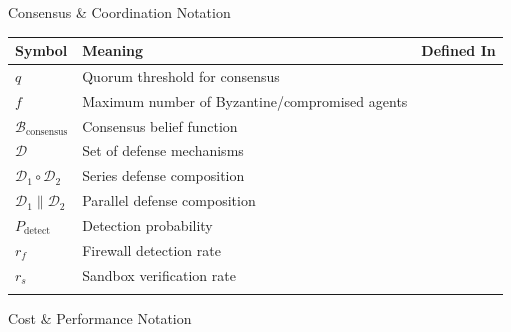\documentclass[
  ignorenonframetext,
]{beamer}
\newcounter{none} %
\providecommand{\cref}[1]{\texttt{\detokenize{#1}}}
\begin{document}
\begin{frame}[allowframebreaks]{Consensus \& Coordination Notation}
{\def\LTcaptype{none} %
\begin{longtable}[]{@{}
  >{\raggedright\arraybackslash}p{}
  >{\raggedright\arraybackslash}p{}
  >{\raggedright\arraybackslash}p{}@{}}
\toprule\noalign{}
\begin{minipage}[b]{\linewidth}\raggedright
Symbol
\end{minipage} & \begin{minipage}[b]{\linewidth}\raggedright
Meaning
\end{minipage} & \begin{minipage}[b]{\linewidth}\raggedright
Defined In
\end{minipage} \\
\midrule\noalign{}
\endhead
\(q\) & Quorum threshold for consensus & \cref{def:quorum} \\
\(f\) & Maximum number of Byzantine/compromised agents &
\cref{thm:byzantine-req} \\
\(\mathcal{B}_{\text{consensus}}\) & Consensus belief function &
\cref{def:cog-byzantine} \\
\(\mathcal{D}\) & Set of defense mechanisms &
\cref{def:defense-composition} \\
\(\mathcal{D}_1 \circ \mathcal{D}_2\) & Series defense composition &
\cref{eq:series-comp} \\
\(\mathcal{D}_1 \parallel \mathcal{D}_2\) & Parallel defense composition
& \cref{eq:parallel-comp} \\
\(P_{\text{detect}}\) & Detection probability &
\cref{eq:series-detection} \\
\(r_f\) & Firewall detection rate & \cref{thm:belief-injection} \\
\(r_s\) & Sandbox verification rate & \cref{thm:belief-injection} \\
\bottomrule\noalign{}
\end{longtable}
}
\end{frame}

\begin{frame}[allowframebreaks]{Cost \& Performance Notation}
\protect{}\label{cost-performance-notation}
\end{frame}
\end{document}

